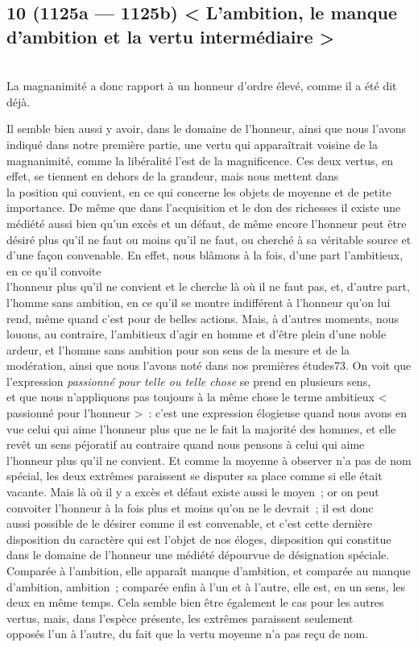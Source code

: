 \documentclass[french,twoside]{book} %
\begin{document}
\subsection[{10 (1125a — 1125b) < L’ambition, le manque d’ambition et la vertu intermédiaire >}]{10 (1125a — 1125b) < L’ambition, le manque d’ambition et la vertu intermédiaire >}
\noindent \\
La magnanimité a donc rapport à un honneur d’ordre élevé, comme il a été dit déjà.\par
 Il semble bien aussi y avoir, dans le domaine de l’honneur, ainsi que nous l’avons indiqué dans notre première partie, une vertu qui apparaîtrait voisine de la magnanimité, comme la libéralité l’est de la magnificence. Ces deux vertus, en effet, se tiennent en dehors de la grandeur, mais nous mettent dans \\
la position qui convient, en ce qui concerne les objets de moyenne et de petite importance. De même que dans l’acquisition et le don des richesses il existe une médiété aussi bien qu’un excès et un défaut, de même encore l’honneur peut être désiré plus qu’il ne faut ou moins qu’il ne faut, ou cherché à sa véritable source et d’une façon convenable. En effet, nous blâmons à la fois, d’une part l’ambitieux, en ce qu’il convoite \\
l’honneur plus qu’il ne convient et le cherche là où il ne faut pas, et, d’autre part, l’homme sans ambition, en ce qu’il se montre indifférent à l’honneur qu’on lui rend, même quand c’est pour de belles actions. Mais, à d’autres moments, nous louons, au contraire, l’ambitieux d’agir en homme et d’être plein d’une noble ardeur, et l’homme sans ambition pour son sens de la mesure et de la modération, ainsi que nous l’avons noté dans nos premières études73. On voit que l’expression {\itshape passionné pour telle ou telle chose} se prend en plusieurs sens, \\
et que nous n’appliquons pas toujours à la même chose le terme ambitieux < passionné pour l’honneur > : c’est une expression élogieuse quand nous avons en vue celui qui aime l’honneur plus que ne le fait la majorité des hommes, et elle revêt un sens péjoratif au contraire quand nous pensons à celui qui aime l’honneur plus qu’il ne convient. Et comme la moyenne à observer n’a pas de nom spécial, les deux extrêmes paraissent se disputer sa place comme si elle était vacante. Mais là où il y a excès et défaut existe aussi le moyen ; or on peut convoiter l’honneur à la fois plus et moins qu’on ne le devrait ; il est donc \\
aussi possible de le désirer comme il est convenable, et c’est cette dernière disposition du caractère qui est l’objet de nos éloges, disposition qui constitue dans le domaine de l’honneur une médiété dépourvue de désignation spéciale. Comparée à l’ambition, elle apparaît manque d’ambition, et comparée au manque d’ambition, ambition ; comparée enfin à l’un et à l’autre, elle est, en un sens, les deux en même temps. Cela semble bien être également le cas pour les autres vertus, mais, dans l’espèce présente, les extrêmes paraissent seulement \\
opposés l’un à l’autre, du fait que la vertu moyenne n’a pas reçu de nom.
\end{document}
